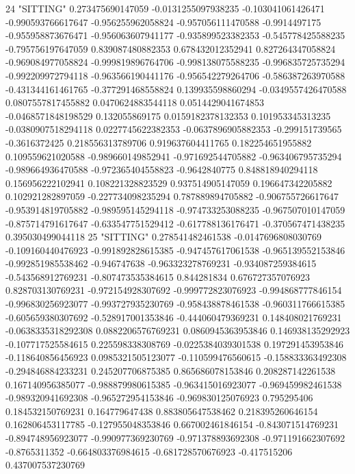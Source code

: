 24 "SITTING" 0.273475690147059 -0.0131255097938235 -0.103041061426471 -0.990593766617647 -0.956255962058824 -0.957056111470588 -0.9914497175 -0.955958873676471 -0.956063607941177 -0.935899523382353 -0.545778425588235 -0.795756197647059 0.839087480882353 0.678432012352941 0.827264347058824 -0.969084977058824 -0.999819896764706 -0.998138075588235 -0.996835725735294 -0.992209972794118 -0.963566190441176 -0.956542279264706 -0.586387263970588 -0.431344161461765 -0.377291468558824 0.139935598860294 -0.0349557426470588 0.0807557817455882 0.0470624883544118 0.0514429041674853 -0.0468571848198529 0.132055869175 0.0159182378132353 0.101953345313235 -0.0380907518294118 0.0227745622382353 -0.0637896905882353 -0.299151739565 -0.3616372425 0.218556313789706 0.919637604411765 0.182254651955882 0.109559621020588 -0.989660149852941 -0.971692544705882 -0.963406795735294 -0.989664936470588 -0.972365404558823 -0.9642840775 0.848818940294118 0.156956222102941 0.108221328823529 0.937514905147059 0.196647342205882 0.102921282897059 -0.227734098235294 0.787889894705882 -0.906755726617647 -0.953914819705882 -0.989595145294118 -0.974733253088235 -0.967507010147059 -0.875714791617647 -0.633547751529412 -0.617788136176471 -0.370567471438235 0.395030499044118
25 "SITTING" 0.278541482461538 -0.0147696808030769 -0.109160440476923 -0.991892828615385 -0.947457617061538 -0.965139552153846 -0.992851985538462 -0.946747638 -0.963323278769231 -0.934087259384615 -0.543568912769231 -0.807473535384615 0.844281834 0.676727357076923 0.828703130769231 -0.972154928307692 -0.999772823076923 -0.994868777846154 -0.996830256923077 -0.993727935230769 -0.958438878461538 -0.960311766615385 -0.605659380307692 -0.528917001353846 -0.444060479369231 0.148408021769231 -0.0638335318292308 0.0882206576769231 0.0860945363953846 0.146938135292923 -0.107717525584615 0.225598338308769 -0.0225384039301538 0.197291453953846 -0.118640856456923 0.0985321505123077 -0.110599476560615 -0.158833363492308 -0.294846884233231 0.245207706875385 0.865686078153846 0.208287142261538 0.167140956385077 -0.988879980615385 -0.963415016923077 -0.969459982461538 -0.989320941692308 -0.965272954153846 -0.969830125076923 0.795295406 0.184532150769231 0.164779647438 0.883805647538462 0.218395260646154 0.162806453117785 -0.127955048353846 0.667002461846154 -0.843071514769231 -0.894748956923077 -0.990977369230769 -0.971378893692308 -0.971191662307692 -0.8765311352 -0.664803376984615 -0.681728570676923 -0.417515206 0.437007537230769
